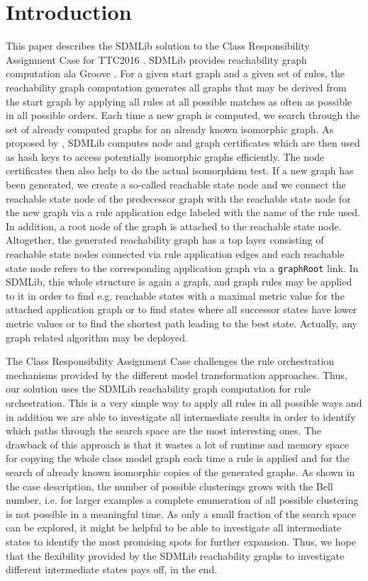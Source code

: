 \documentclass[submission,copyright,creativecommons]{eptcs}
\begin{document}
\section{Introduction}
\label{sec:intro}

This paper describes the SDMLib solution to the Class Responsibility Assignment Case for TTC2016
\cite{ttc2016-case}. SDMLib provides reachability graph computation ala Groove 
\cite{rensink2003groove}. For a given start graph and a given set of rules, 
the reachability graph computation generates all graphs that may be derived from 
the start graph by applying all rules at all 
possible matches as often as possible in all possible orders. Each time a new 
graph is 
computed, we search through the set of already computed graphs for an already known 
isomorphic graph. As proposed by \cite{rensink2003groove}, SDMLib computes node and graph 
certificates which are then used as hash keys to access potentially isomorphic 
graphs efficiently. The node certificates then also help to do the actual 
isomorphism test. If a new 
graph has been generated, we create a so-called reachable state 
node and we connect the reachable state node of the predecessor graph with the reachable 
state node for the new graph via a rule application edge labeled with the name of 
the rule used. In addition, a root node of the graph is attached to the reachable state node. 
Altogether, the generated reachability graph has a top layer consisting of reachable 
state nodes connected via rule application edges and each reachable state node refers to 
the corresponding application graph via a \texttt{graphRoot} link. In SDMLib, this whole 
structure is again a graph, and graph rules may be applied to it in order to find e.g. 
reachable states with a maximal metric value for the attached application graph 
or to find states 
where all successor states have lower metric values or to find the shortest path leading to 
the best state. Actually, any graph related algorithm may be deployed.  

The Class Responsibility Assignment Case challenges the rule orchestration mechanisms 
provided by the different model transformation approaches. Thus, our solution uses the SDMLib 
reachability graph computation for rule orchestration. This is a very simple way to apply 
all rules in all possible ways and in addition we are able to investigate all intermediate 
results in order to identify which paths through the search space are the most interesting 
ones. The drawback of this approach is that it wastes a lot of runtime and memory space 
for copying the whole class model graph each time a rule is applied and for the search of 
already known isomorphic copies of the generated graphs. As shown in the case 
description, the number of possible clusterings grows with the Bell number, i.e. 
for larger examples a complete enumeration of all possible clustering is not possible in a 
meaningful time. As only a small fraction of the search space can be explored, it might be 
helpful to be able to investigate all intermediate states to identify the most promising spots 
for further expansion. Thus, we hope that the flexibility provided by the SDMLib reachability 
graphs to investigate different intermediate states pays off, in the end. 
\end{document}
